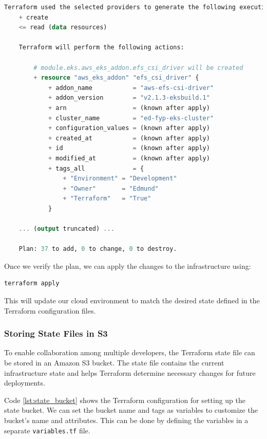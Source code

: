 \begin{lstlisting}[language=Terraform, caption={Terraform Plan Output}, label={lst:terraform_plan}]
Terraform used the selected providers to generate the following execution plan. Resource actions are indicated with the following symbols:
    + create
    <= read (data resources)
  
    Terraform will perform the following actions:
    
        # module.eks.aws_eks_addon.efs_csi_driver will be created
        + resource "aws_eks_addon" "efs_csi_driver" {
            + addon_name           = "aws-efs-csi-driver"
            + addon_version        = "v2.1.3-eksbuild.1"
            + arn                  = (known after apply)
            + cluster_name         = "ed-fyp-eks-cluster"
            + configuration_values = (known after apply)
            + created_at           = (known after apply)
            + id                   = (known after apply)
            + modified_at          = (known after apply)
            + tags_all             = {
                + "Environment" = "Development"
                + "Owner"       = "Edmund"
                + "Terraform"   = "True"
            }
        
    ... (output truncated) ...

    Plan: 37 to add, 0 to change, 0 to destroy.

\end{lstlisting}

Once we verify the plan, we can apply the changes to the infrastructure using: 
\begin{verbatim}
terraform apply
\end{verbatim}

This will update our cloud environment to match the desired state defined in the Terraform configuration files.


\subsubsection{Storing State Files in S3}
To enable collaboration among multiple developers, the Terraform state file can be stored in an Amazon S3 bucket. The state file contains the current infrastructure state and helps Terraform determine necessary changes for future deployments.


Code \ref{lst:state_bucket} shows the Terraform configuration for setting up the state bucket. We can set the bucket name and tags as variables to customize the bucket's name and attributes. This can be done by defining the variables in a separate \texttt{variables.tf} file.

